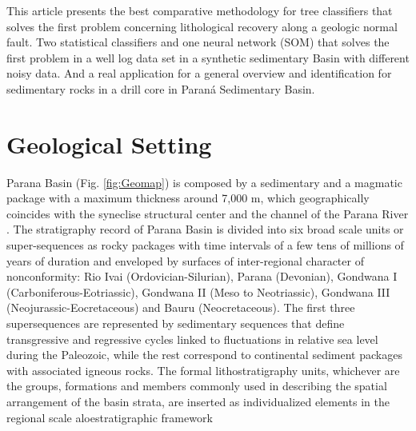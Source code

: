 \documentclass[preprint,12pt]{elsarticle}
\begin{document}


This article presents the best comparative methodology for tree classifiers that solves the first problem concerning lithological recovery along a geologic normal fault. Two statistical classifiers and one neural network (SOM) that solves the first problem in a well log data set in a synthetic sedimentary Basin with different noisy data. And a real application for a general overview and identification for sedimentary rocks in a drill core in Paran\'a Sedimentary Basin.  

\section{Geological Setting}
\label{sec:GeoSet}
Parana Basin (Fig. \ref{fig:Geomap}) is composed by a sedimentary and a magmatic package with a maximum thickness around 7,000 m, which geographically coincides with the syneclise structural center and the channel of the Parana River \citep{Milani1998,Milani2008}. The stratigraphy record of Parana Basin is divided into six broad scale units or super-sequences \citep{Vail_1977} as rocky packages with time intervals of a few tens of millions of years of duration and enveloped by surfaces of inter-regional character of nonconformity: Rio Ivai (Ordovician-Silurian), Parana (Devonian), Gondwana I (Carboniferous-Eotriassic), Gondwana II (Meso to Neotriassic), Gondwana III (Neojurassic-Eocretaceous) and Bauru (Neocretaceous). The first three supersequences are represented by sedimentary sequences that define transgressive and regressive cycles linked to fluctuations in relative sea level during the Paleozoic, while the rest correspond to continental sediment packages with associated igneous rocks. The formal lithostratigraphy units, whichever are the groups, formations and members commonly used in describing the spatial arrangement of the basin strata, are inserted as individualized elements in the regional scale aloestratigraphic framework \citep{Vidotti_1998,milani_outline_1999}
\end{document}

